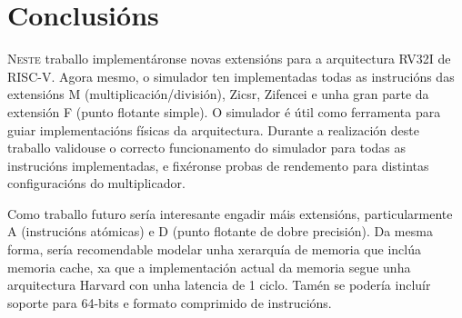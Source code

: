 \chapter{Conclusións}
\label{chap:conclusions}
 
\lettrine{N}{este} traballo implementáronse novas extensións para a arquitectura RV32I de RISC-V. Agora mesmo, o simulador ten implementadas todas as instrucións das extensións M (multiplicación/división), Zicsr, Zifencei e unha gran parte da extensión F (punto flotante simple). O simulador é útil como ferramenta para guiar implementacións físicas da arquitectura. Durante a realización deste traballo validouse o correcto funcionamento do simulador para todas as instrucións implementadas, e fixéronse probas de rendemento para distintas configuracións do multiplicador.

Como traballo futuro sería interesante engadir máis extensións, particularmente A (instrucións atómicas) e D (punto flotante de dobre precisión). Da mesma forma, sería recomendable modelar unha xerarquía de memoria que inclúa memoria cache, xa que a implementación actual da memoria segue unha arquitectura Harvard con unha latencia de 1 ciclo. Tamén se podería incluír soporte para 64-bits e formato comprimido de instrucións. 